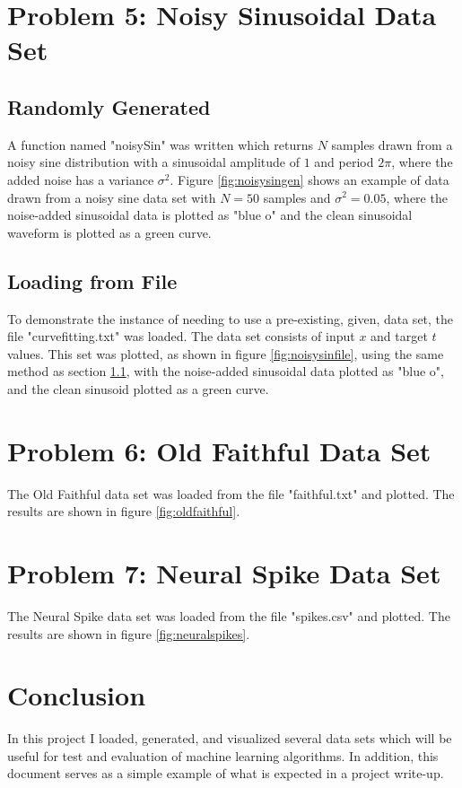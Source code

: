 \documentclass[conference]{IEEEtran}
\begin{document}
\section{Problem 5: Noisy Sinusoidal Data Set}
\subsection{Randomly Generated}\label{section:randomgen}
A function named "noisySin" was written which returns $N$ samples drawn from a noisy sine distribution with a sinusoidal amplitude of $1$ and period $2\pi$, where the added noise has a variance $\sigma^2$. Figure \ref{fig:noisysingen} shows an example of data drawn from a noisy sine data set with $N=50$ samples and $\sigma^2=0.05$, where the noise-added sinusoidal data is plotted as "blue o" and the clean sinusoidal waveform is plotted as a green curve.

\subsection{Loading from File}
To demonstrate the instance of needing to use a pre-existing, given, data set, the file "curvefitting.txt" was loaded. The data set consists of input $x$ and target $t$ values. This set was plotted, as shown in figure \ref{fig:noisysinfile}, using the same method as section \ref{section:randomgen}, with the noise-added sinusoidal data plotted as "blue o", and the clean sinusoid plotted as a green curve.

\section{Problem 6: Old Faithful Data Set}
The Old Faithful data set was loaded from the file "faithful.txt" and plotted. The results are shown in figure \ref{fig:oldfaithful}.

\section{Problem 7: Neural Spike Data Set}
The Neural Spike data set was loaded from the file "spikes.csv" and plotted. The results are shown in figure \ref{fig:neuralspikes}.

\section{Conclusion}
In this project I loaded, generated, and visualized several data sets which will be useful for test and evaluation of machine learning algorithms. In addition, this document serves as a simple example of what is expected in a project write-up.
\end{document}

